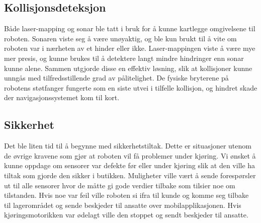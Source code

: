 \subsection{Kollisjonsdeteksjon}

Både laser-mapping og sonar ble tatt i bruk for å kunne kartlegge omgivelsene til roboten. Sonaren viste seg å være unøyaktig, og ble kun brukt til å vite om roboten var i nærheten av et hinder eller ikke. Laser-mappingen viste å være mye mer presis, og kunne brukes til å detektere langt mindre hindringer enn sonar kunne alene. Sammen utgjorde disse en effektiv løsning, slik at kollisjoner kunne unngås med tilfredsstillende grad av pålitelighet. De fysiske bryterene på robotens støtfanger fungerte som en siste utvei i tilfelle kollisjon, og hindret skade der navigasjonssystemet kom til kort.

\subsection{Sikkerhet}
Det ble liten tid til å begynne med sikkerhetstiltak. Dette er situasjoner utenom de øvrige kravene som gjør at roboten vil få problemer under kjøring. Vi ønsket å kunne oppdage om sensorer var defekte før eller under kjøring slik at den ville ha tiltak som gjorde den sikker i butikken. Muligheter ville vært å sende forespørsler ut til alle sensorer hvor de måtte gi gode verdier tilbake som tilsier noe om tilstanden. Hvis noe var feil ville roboten si ifra til kunde og komme seg tilbake til lagerområdet og sende beskjeder til ansatte over mobilapplikasjonen. Hvis kjøringsmotorikken var ødelagt ville den stoppet og sendt beskjeder til ansatte.